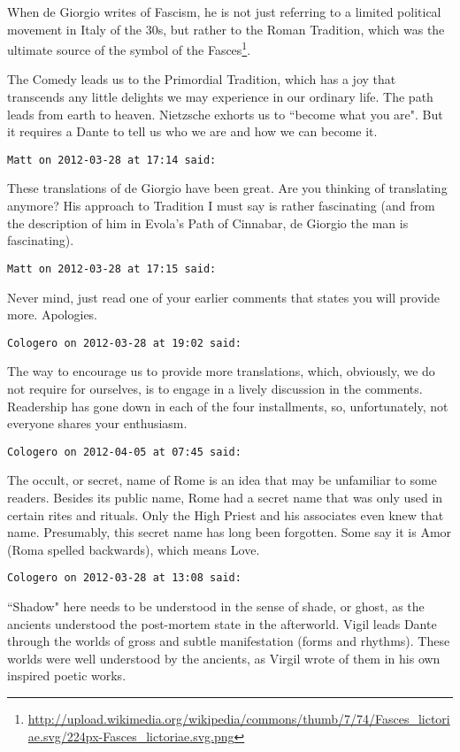 \begin{footnotesize}
\begin{sffamily}
When de Giorgio writes of Fascism, he is not just referring to a limited political movement in Italy of the 30s, but rather to the Roman Tradition, which was the ultimate source of the symbol of the Fasces\footnote{\url{http://upload.wikimedia.org/wikipedia/commons/thumb/7/74/Fasces_lictoriae.svg/224px-Fasces_lictoriae.svg.png}}.

The Comedy leads us to the Primordial Tradition, which has a joy that transcends any little delights we may experience in our ordinary life. The path leads from earth to heaven. Nietzsche exhorts us to ``become what you are". But it requires a Dante to tell us who we are and how we can become it.


\hfill

\texttt{Matt on 2012-03-28 at 17:14 said: }

These translations of de Giorgio have been great. Are you thinking of translating anymore? His approach to Tradition I must say is rather fascinating (and from the description of him in Evola's Path of Cinnabar, de Giorgio the man is fascinating).


\hfill

\texttt{Matt on 2012-03-28 at 17:15 said: }

Never mind, just read one of your earlier comments that states you will provide more. Apologies.


\hfill

\texttt{Cologero on 2012-03-28 at 19:02 said: }

The way to encourage us to provide more translations, which, obviously, we do not require for ourselves, is to engage in a lively discussion in the comments. Readership has gone down in each of the four installments, so, unfortunately, not everyone shares your enthusiasm.


\hfill

\texttt{Cologero on 2012-04-05 at 07:45 said: }

The occult, or secret, name of Rome is an idea that may be unfamiliar to some readers. Besides its public name, Rome had a secret name that was only used in certain rites and rituals. Only the High Priest and his associates even knew that name. Presumably, this secret name has long been forgotten. Some say it is Amor (Roma spelled backwards), which means Love.


\hfill

\texttt{Cologero on 2012-03-28 at 13:08 said: }

``Shadow" here needs to be understood in the sense of shade, or ghost, as the ancients understood the post-mortem state in the afterworld. Vigil leads Dante through the worlds of gross and subtle manifestation (forms and rhythms). These worlds were well understood by the ancients, as Virgil wrote of them in his own inspired poetic works.


\end{sffamily}
\end{footnotesize}

